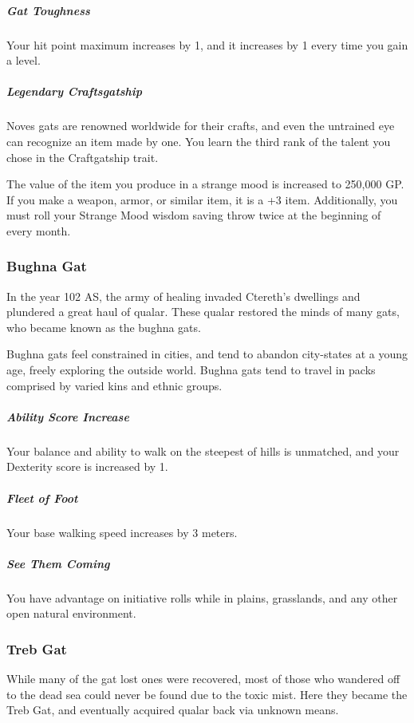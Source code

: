 \begin{linenumbers}

\subparagraph{Gat Toughness} Your hit point maximum increases by 1, and it increases by 1 every time you gain a level.

\subparagraph{Legendary Craftsgatship} Noves gats are renowned worldwide for their crafts, and even the untrained eye can recognize an item made by one.
You learn the third rank of the talent you chose in the Craftgatship trait.

The value of the item you produce in a strange mood is increased to 250,000 GP.
If you make a weapon, armor, or similar item, it is a +3 item.
Additionally, you must roll your Strange Mood wisdom saving throw twice at the beginning of every month.

\subsubsection{Bughna Gat}
In the year 102 AS, the army of healing invaded Ctereth's dwellings and plundered a great haul of qualar.
These qualar restored the minds of many gats, who became known as the bughna gats.

Bughna gats feel constrained in cities, and tend to abandon city-states at a young age, freely exploring the outside world.
Bughna gats tend to travel in packs comprised by varied kins and ethnic groups.

\subparagraph{Ability Score Increase} Your balance and ability to walk on the steepest of hills is unmatched, and your Dexterity score is increased by 1.

\subparagraph{Fleet of Foot} Your base walking speed increases by 3 meters.


\subparagraph{See Them Coming} You have advantage on initiative rolls while in plains, grasslands, and any other open natural environment.

\subsubsection{Treb Gat}
While many of the gat lost ones were recovered, most of those who wandered off to the dead sea could never be found due to the toxic mist.
Here they became the Treb Gat, and eventually acquired qualar back via unknown means.


\end{linenumbers}
